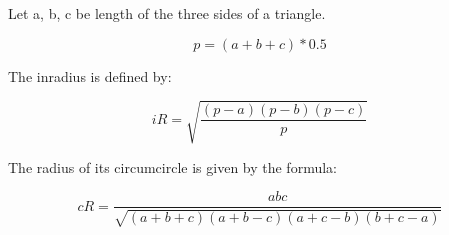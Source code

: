 Let a, b, c be length of the three sides of a triangle.

$$ p = (a + b + c) * 0.5 $$

The inradius is defined by:

$$ iR = \sqrt{\frac{(p - a)(p - b)(p - c)}{p}}$$

The radius of its circumcircle is given by the formula:

$$ cR = \frac{abc}{\sqrt{(a + b + c)(a + b - c)(a + c - b)(b + c - a)}}$$
